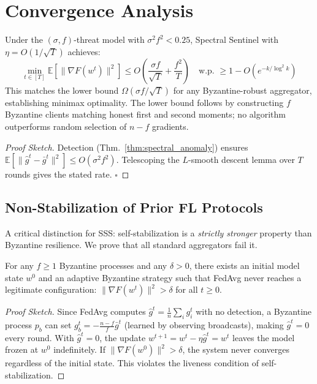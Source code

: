 \documentclass[runningheads]{llncs}
\begin{document}
\section{Convergence Analysis}

\begin{theorem}
\label{thm:convergence}
Under the $(\sigma, f)$-threat model with $\sigma^2 f^2 < 0.25$, Spectral Sentinel with $\eta = O(1/\sqrt{T})$ achieves:
\[
\min_{t \in [T]} \mathbb{E}[\|\nabla F(w^t)\|^2] \leq O\!\left(\frac{\sigma f}{\sqrt{T}} + \frac{f^2}{T}\right) \quad \text{w.p.\ } \geq 1 - O(e^{-k/\log^2 k})
\]
This matches the lower bound $\Omega(\sigma f/\sqrt{T})$ for any Byzantine-robust aggregator, establishing minimax optimality. The lower bound follows by constructing $f$ Byzantine clients matching honest first and second moments; no algorithm outperforms random selection of $n-f$ gradients.
\end{theorem}

\begin{proof}[Proof Sketch]
Detection (Thm.~\ref{thm:spectral_anomaly}) ensures $\mathbb{E}[\|\hat{g}^t - \bar{g}^t\|^2] \leq O(\sigma^2 f^2)$. Telescoping the $L$-smooth descent lemma over $T$ rounds gives the stated rate. \hfill$\square$
\end{proof}

\subsection{Non-Stabilization of Prior FL Protocols}
\label{sec:non_stab}

A critical distinction for SSS: self-stabilization is a \emph{strictly stronger} property than Byzantine resilience. We prove that all standard aggregators fail it.

\begin{theorem}
\label{thm:fedavg_nonstab}
For any $f \geq 1$ Byzantine processes and any $\delta > 0$, there exists an initial model state $w^0$ and an adaptive Byzantine strategy such that FedAvg never reaches a legitimate configuration: $\|\nabla F(w^t)\|^2 > \delta$ for all $t \geq 0$.
\end{theorem}

\begin{proof}[Proof Sketch]
Since FedAvg computes $\hat{g}^t = \frac{1}{n}\sum_i g_i^t$ with no detection, a Byzantine process $p_b$ can set $g_b^t = -\frac{n-f}{f}\bar{g}^t$ (learned by observing broadcasts), making $\hat{g}^t = 0$ every round. With $\hat{g}^t = 0$, the update $w^{t+1} = w^t - \eta\hat{g}^t = w^t$ leaves the model frozen at $w^0$ indefinitely. If $\|\nabla F(w^0)\|^2 > \delta$, the system never converges regardless of the initial state. This violates the liveness condition of self-stabilization.
\end{proof}
\end{document}
